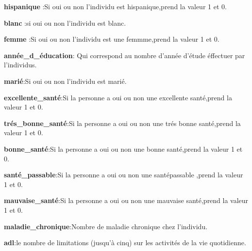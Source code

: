 \documentclass[
  14pt,
  french,
]{article}
\begin{document}
\linebreak

\textbf{hispanique} :Si oui ou non l'individu est hispanique,prend la
valeur 1 et 0.

\linebreak

\textbf{blanc} :si oui ou non l'individu est blanc.

\linebreak

\textbf{femme} :Si oui ou non l'individu est une femmme,prend la valeur
1 et 0.

\linebreak

\textbf{année\_d\_éducation}: Qui correspond au nombre d'année d'étude
éffectuer par l'individus.

\linebreak

\textbf{marié}:Si oui ou non l'individu est marié.

\linebreak

\textbf{excellente\_santé}:Si la personne a oui ou non une excellente
santé,prend la valeur 1 et 0.

\linebreak

\textbf{trés\_bonne\_santé}:Si la personne a oui ou non une trés bonne
santé,prend la valeur 1 et 0.

\linebreak

\textbf{bonne\_santé}:Si la personne a oui ou non une bonne santé,prend
la valeur 1 et 0.

\linebreak

\textbf{santé\_passable}:Si la personne a oui ou non une santépassable
,prend la valeur 1 et 0.

\linebreak

\textbf{mauvaise\_santé}:Si la personne a oui ou non une mauvaise
santé,prend la valeur 1 et 0.

\linebreak

\textbf{maladie\_chronique}:Nombre de maladie chronique chez l'individu.

\linebreak

\textbf{adl}:le nombre de limitations (jusqu'à cinq) sur les activités
de la vie quotidienne.
\end{document}
